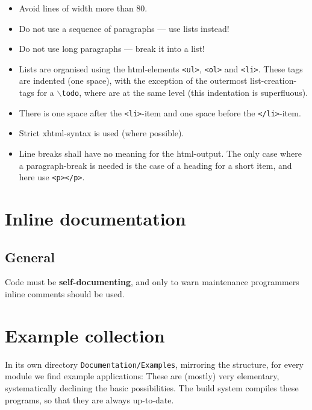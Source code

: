 \documentclass{book}
\begin{document}
\begin{itemize}
\item Avoid lines of width more than 80.
\item Do not use a sequence of paragraphs --- use lists instead!
\item Do not use long paragraphs --- break it into a list!
\item Lists are organised using the html-elements \texttt{<ul>}, \texttt{<ol>} and \texttt{<li>}. These tags are indented (one space), with the exception of the outermost list-creation-tags for a \texttt{$\backslash$todo}, where are at the same level (this indentation is superfluous).
\item There is one space after the \texttt{<li>}-item and one space before the \texttt{</li>}-item.
\item Strict xhtml-syntax is used (where possible).
\item Line breaks shall have no meaning for the html-output. The only case where a paragraph-break is needed is the case of a heading for a short item, and here use \texttt{<p></p>}.
\end{itemize}
 









\chapter{Inline documentation}
\label{cha:InlineDoc}

\section{General}
\label{sec:InlineDocGeneral}

Code must be \textbf{self-documenting}, and only to warn maintenance programmers inline comments should be used.


\chapter{Example collection}
\label{cha:DocumentationExamples}

In its own directory \texttt{Documentation/Examples}, mirroring the \OKlibrary{} structure, for every module we find example applications: These are (mostly) very elementary, systematically declining the basic possibilities. The build system compiles these programs, so that they are always up-to-date.
\end{document}
